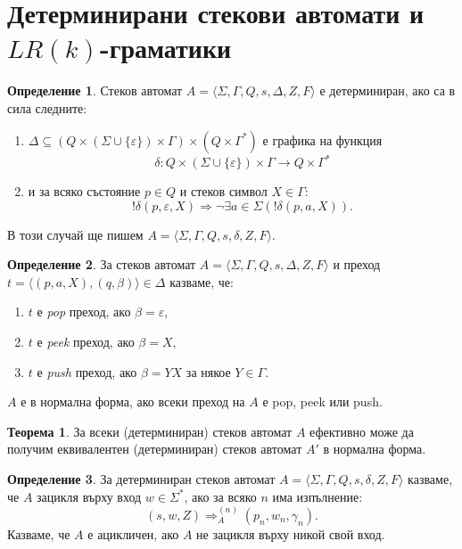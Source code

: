 \documentclass[a4paper]{article}
\theoremstyle{definition}
\newtheorem{theorem}{Теорема}
\newtheorem{definition}{Определение}
\begin{document}
\section{Детерминирани стекови автомати и $LR(k)$-граматики}
\begin{definition}
Стеков автомат $A=\langle \Sigma,\Gamma,Q,s,\Delta,Z,F\rangle$ е детерминиран, ако са в сила следните:
\begin{enumerate}
\item $\Delta\subseteq (Q\times(\Sigma\cup \{\varepsilon\})\times \Gamma)\times (Q\times \Gamma^*)$ е графика
на функция 
\begin{equation*}
\delta:Q\times(\Sigma\cup\{\varepsilon\})\times \Gamma\rightarrow Q\times \Gamma^*
\end{equation*}
\item и за всяко състояние $p\in Q$ и стеков символ $X\in \Gamma$:
\begin{equation*}
! \delta(p,\varepsilon,X) \Rightarrow \neg \exists a\in \Sigma( ! \delta(p,a,X)).
\end{equation*}
\end{enumerate}
В този случай ще пишем $A=\langle \Sigma,\Gamma,Q,s,\delta,Z,F\rangle$.
\end{definition}
\begin{definition}
За стеков автомат $A=\langle \Sigma,\Gamma,Q,s,\Delta,Z,F\rangle$ и преход $t=\langle (p,a,X),(q,\beta)\rangle\in \Delta$
казваме, че:
\begin{enumerate}
\item $t$ е \emph{pop} преход, ако $\beta=\varepsilon$,
\item $t$ е \emph{peek} преход, ако $\beta=X$,
\item $t$ е \emph{push} преход, ако $\beta=YX$ за някое $Y\in \Gamma$.
\end{enumerate}
$A$ е в нормална форма, ако всеки преход на $A$ е pop, peek или push.  
\end{definition}
\begin{theorem}
За всеки (детерминиран) стеков автомат $A$ ефективно може да получим еквивалентен 
(детерминиран) стеков автомат $A'$ в нормална форма.
\end{theorem}
\begin{definition}
За детерминиран стеков автомат $A=\langle \Sigma,\Gamma,Q,s,\delta,Z,F\rangle$ казваме, че $A$ зацикля върху вход $w\in \Sigma^*$, ако
за всяко $n$ има изпълнение:
\begin{equation*}
(s,w,Z)\Rightarrow^{(n)}_A (p_n,w_n,\gamma_n).
\end{equation*}
Казваме, че $A$ е ацикличен, ако $A$ не зацикля върху никой свой вход.
\end{definition}
\end{document}
